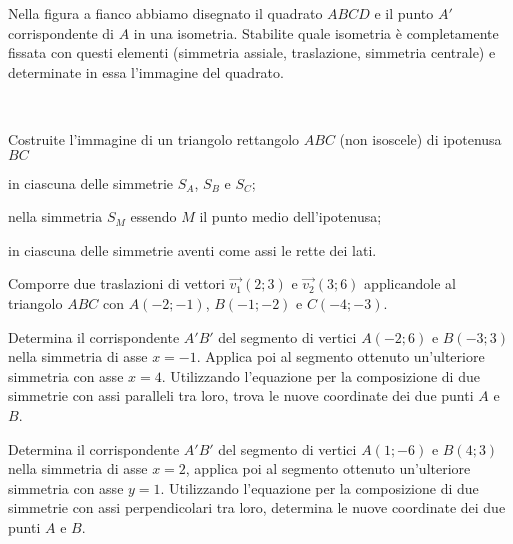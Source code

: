 \noindent\begin{minipage}{0.65\textwidth}\parindent15pt
\begin{esercizio}
\label{ese:8.95} %
Nella figura a fianco abbiamo disegnato il quadrato $ABCD$ e il punto $A'$ corrispondente di $A$ in una isometria. Stabilite quale isometria è completamente fissata con questi elementi (simmetria assiale, traslazione, simmetria centrale) e determinate in essa l'immagine del quadrato. 
\end{esercizio}
\end{minipage}\hfil
\begin{minipage}{0.35\textwidth}
	\centering~~
\end{minipage}\vspace{8pt}

\begin{esercizio}
\label{ese:8.96} %
Costruite l'immagine di un triangolo rettangolo $ABC$ (non isoscele) di ipotenusa $BC$
\begin{enumeratea}
\item in ciascuna delle simmetrie $S_A$, $S_B$ e $S_C$;
\item nella simmetria $S_M$ essendo $M$ il punto medio dell'ipotenusa;
\item in ciascuna delle simmetrie aventi come assi le rette dei lati.
\end{enumeratea}
\end{esercizio}

\begin{esercizio}
\label{ese:8.97} %
Comporre due traslazioni di vettori $\vec{v_1}(2;3)$ e $\vec{v_2}(3;6)$ applicandole al triangolo $ABC$ con $A(-2;-1)$, $B(-1;-2)$ e $C(-4;-3)$.
\end{esercizio}

\begin{esercizio}
\label{ese:8.98} %
Determina il corrispondente $A'B'$ del segmento di vertici $A(-2;6)$ e $B(-3;3)$ nella simmetria di asse $x=-1$. Applica poi al segmento ottenuto un'ulteriore simmetria con asse $x=4$. Utilizzando l'equazione per la composizione di due simmetrie con assi paralleli tra loro, trova le nuove coordinate dei due punti $A$ e $B$.
\end{esercizio}

\begin{esercizio}
\label{ese:8.99} %
Determina il corrispondente $A'B'$ del segmento di vertici $A(1;-6)$ e $B(4;3)$ nella simmetria di asse $x = 2$, applica poi al segmento ottenuto un'ulteriore simmetria con asse $y = 1$. Utilizzando l'equazione per la composizione di due simmetrie con assi perpendicolari tra loro, determina le nuove coordinate dei due punti $A$ e $B$.
\end{esercizio}

